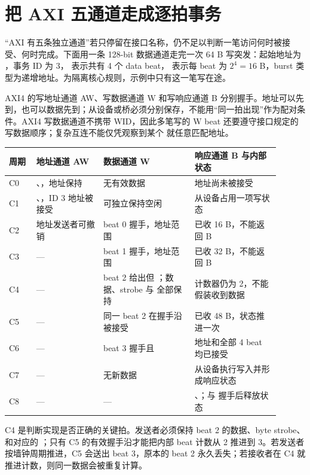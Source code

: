 \section{把 AXI 五通道走成逐拍事务}

“AXI 有五条独立通道”若只停留在接口名称，仍不足以判断一笔访问何时被接受、何时完成。下面用一条 128-bit 数据通道走完一次 64 B 写突发：起始地址为 ，事务 ID 为 3， 表示共有 4 个 data beat， 表示每 beat 为 $2^4=16$ B，burst 类型为递增地址。为隔离核心规则，示例中只有这一笔写在途。

AXI4 的写地址通道 AW、写数据通道 W 和写响应通道 B 分别握手。地址可以先到，也可以数据先到；从设备或桥必须分别保存，不能用“同一拍出现”作为配对条件。AXI4 写数据通道不携带 WID，因此多笔写的 W beat 还要遵守接口规定的写数据顺序；复杂互连不能仅凭观察到某个  就任意匹配地址。


\begin{longtable}{L{0.09\linewidth}L{0.22\linewidth}L{0.30\linewidth}L{0.29\linewidth}}
\toprule
周期 & 地址通道 AW & 数据通道 W & 响应通道 B 与内部状态 \\
\midrule
C0 & 、，地址保持 & 无有效数据 & 地址尚未被接受 \\
C1 & 、，ID 3 地址被接受 & 可独立保持空闲 & 从设备占用一项写状态 \\
C2 & 地址发送者可撤销  & beat 0 握手，地址范围  & 已收 16 B，不能返回 B \\
C3 & --- & beat 1 握手，地址范围  & 已收 32 B，不能返回 B \\
C4 & --- & beat 2 给出但 ；数据、strobe 与  全部保持 & 计数器仍为 2，不能假装收到数据 \\
C5 & --- & 同一 beat 2 在握手沿被接受 & 已收 48 B，状态推进一次 \\
C6 & --- & beat 3 握手且  & 地址和全部 4 beat 均已接受 \\
C7 & --- & 无新数据 & 从设备执行写入并形成响应状态 \\
C8 & --- & --- & 、；与  握手后释放状态 \\
\bottomrule
\end{longtable}

C4 是判断实现是否正确的关键拍。发送者必须保持 beat 2 的数据、byte strobe、 和对应的 ；只有 C5 的有效握手沿才能把内部 beat 计数从 2 推进到 3。若发送者按墙钟周期推进，C5 会送出 beat 3，原本的 beat 2 永久丢失；若接收者在 C4 就推进计数，则同一数据会被重复计算。

